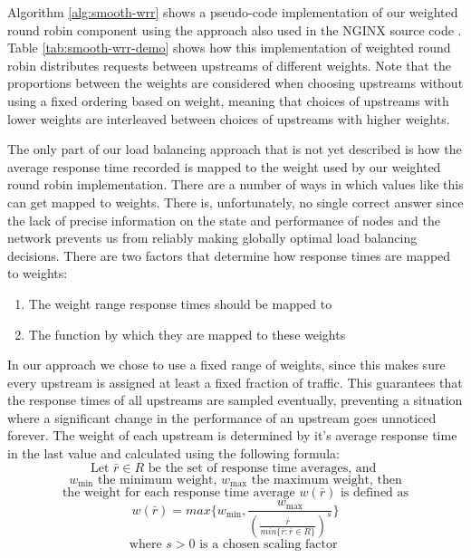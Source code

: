 



Algorithm \ref{alg:smooth-wrr} shows a pseudo-code implementation of our weighted round robin component using the approach also used in the NGINX source code \cite{nginx-wrr}.
Table \ref{tab:smooth-wrr-demo} shows how this implementation of weighted round robin distributes requests between upstreams of different weights. Note that the proportions between the weights are considered when choosing upstreams without using a fixed ordering based on weight, meaning that choices of upstreams with lower weights are interleaved between choices of upstreams with higher weights. %

The only part of our load balancing approach that is not yet described is how the average response time recorded is mapped to the weight used by our weighted round robin implementation.
There are a number of ways in which values like this can get mapped to weights.
There is, unfortunately, no single correct answer since the lack of precise information on the state and performance of nodes and the network prevents us from reliably making globally optimal load balancing decisions.
There are two factors that determine how response times are mapped to weights:
\begin{enumerate}
    \item The weight range response times should be mapped to
    \item The function by which they are mapped to these weights
\end{enumerate}

In our approach we chose to use a fixed range of weights, since this makes sure every upstream is assigned at least a fixed fraction of traffic.
This guarantees that the response times of all upstreams are sampled eventually, preventing a situation where a significant change in the performance of an upstream goes unnoticed forever.
The weight of each upstream is determined by it's average response time in the last value and calculated using the following formula:
\[ \text{Let } \bar{r} \in R \text{ be the set of response time averages, and }\]
\[ w_{\text{min}} \text{ the minimum weight, } w_{\text{max}} \text{ the maximum weight, then}\]
\[ \text{the weight for each response time average } w(\bar{r})\text{ is defined as}\]
\[ w(\bar{r}) = max\{w_{\text{min}}, \frac{w_{\text{max}}}{(\frac{\bar{r}}{min\{\bar{r}: \bar{r} \in R\}})^{s}}\} \]
\[ \text{where } s > 0\text{ is a chosen scaling factor }\]


